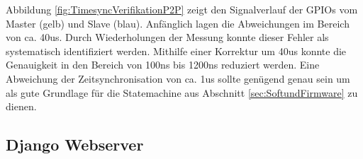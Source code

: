 Abbildung \ref{fig:TimesyncVerifikationP2P} zeigt den Signalverlauf der GPIOs vom Master (gelb) und Slave (blau). Anfänglich lagen die Abweichungen im Bereich von ca. 40us. Durch Wiederholungen der Messung konnte dieser Fehler als systematisch identifiziert werden. Mithilfe einer Korrektur um 40us konnte die Genauigkeit in den Bereich von 100ns bis 1200ns reduziert werden. Eine Abweichung der Zeitsynchronisation von ca. 1us sollte genügend genau sein um als gute Grundlage für die Statemachine aus Abschnitt \ref{sec:SoftundFirmware} zu dienen. 
 
\subsection{Django Webserver}\label{sec:DjangoWebserver}